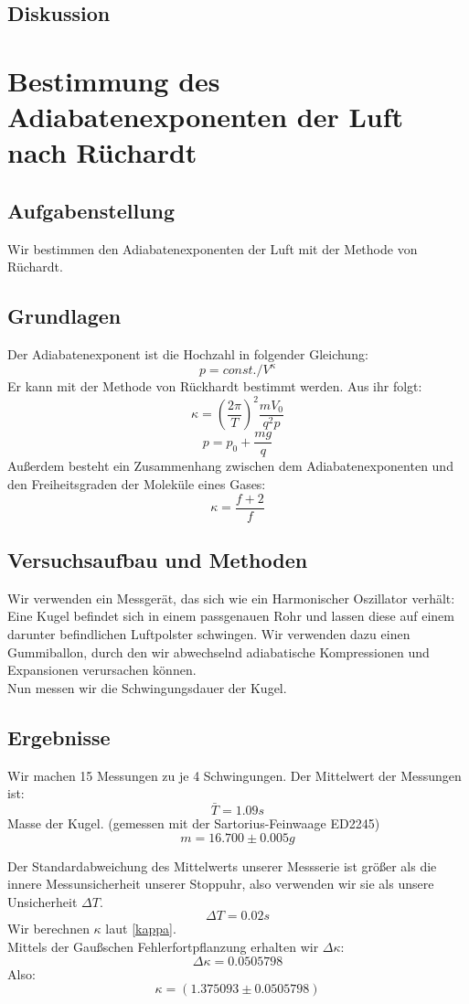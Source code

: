 \documentclass{article}
\begin{document}
\subsection{Diskussion}

\newpage
\section{Bestimmung des Adiabatenexponenten der Luft nach Rüchardt}
\subsection{Aufgabenstellung}
Wir bestimmen den Adiabatenexponenten der Luft mit der Methode von Rüchardt.
\subsection{Grundlagen}
Der Adiabatenexponent ist die Hochzahl in folgender Gleichung:\\
$$p=const./V^{\kappa}$$
Er kann mit der Methode von Rückhardt bestimmt werden. Aus ihr folgt:
\begin{equation}
\label{kappa}
\kappa=(\frac{2\pi}{T})^2 \frac{mV_0}{q^2p}
\end{equation}
$$p=p_0+\frac{mg}{q}$$
Außerdem besteht ein Zusammenhang zwischen dem Adiabatenexponenten und den Freiheitsgraden der Moleküle eines Gases:
$$\kappa=\frac{f+2}{f}$$
\subsection{Versuchsaufbau und Methoden}
Wir verwenden ein Messgerät, das sich wie ein Harmonischer Oszillator verhält: Eine Kugel befindet sich in einem passgenauen Rohr und lassen diese auf einem darunter befindlichen Luftpolster schwingen. Wir verwenden dazu einen Gummiballon, durch den wir abwechselnd adiabatische Kompressionen und Expansionen verursachen können.\\
Nun messen wir die Schwingungsdauer der Kugel. 
\subsection{Ergebnisse}
Wir machen 15 Messungen zu je 4 Schwingungen. Der Mittelwert der Messungen ist:\\
$$\bar{T}=1.09s$$
Masse der Kugel. (gemessen mit der Sartorius-Feinwaage ED2245)\\
$$m=16.700\pm0.005g$$

Der Standardabweichung des Mittelwerts unserer Messserie ist größer als die innere Messunsicherheit unserer Stoppuhr, also verwenden wir sie als unsere Unsicherheit $\Delta T$.
$$\Delta T=0.02s$$
Wir  berechnen $\kappa$ laut \ref{kappa}. \\
Mittels der Gaußschen Fehlerfortpflanzung erhalten wir $\Delta\kappa$:
$$\Delta\kappa=0.0505798$$
Also:
$$\boxed{\kappa=(1.375093 \pm 0.0505798)} $$
\end{document}
